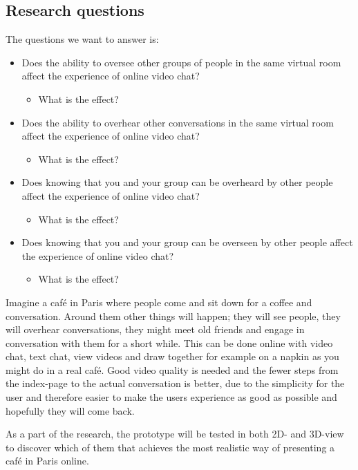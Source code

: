\documentclass[12pt, titlepage]{article}
\begin{document}
\subsection{Research questions}
The questions we want to answer is:
\begin{itemize}
	\item Does the ability to oversee other groups of people in the same virtual room affect the experience of online video chat?
		\begin{itemize}
			\item What is the effect?
		\end{itemize}
	\item Does the ability to overhear other conversations in the same virtual room affect the experience of online video chat?
		\begin{itemize}
			\item What is the effect?
		\end{itemize}
	\item Does knowing that you and your group can be overheard by other people affect the experience of online video chat?
		\begin{itemize}
			\item What is the effect?
		\end{itemize}
	\item Does knowing that you and your group can be overseen by other people affect the experience of online video chat?
		\begin{itemize}
			\item What is the effect?
		\end{itemize}
\end{itemize}

Imagine a café in Paris where people come and sit down for a coffee and conversation. Around them other things will happen; they will see people, they will overhear conversations, they might meet old friends and engage in conversation with them for a short while. This can be done online with video chat, text chat, view videos and draw together for example on a napkin as you might do in a real café. Good video quality is needed and the fewer steps from the index-page to the actual conversation is better, due to the simplicity for the user and therefore easier to make the users experience as good as possible and hopefully they will come back.

As a part of the research, the prototype will be tested in both 2D- and 3D-view to discover which of them that achieves the most realistic way of presenting a café in Paris online.
\end{document}
